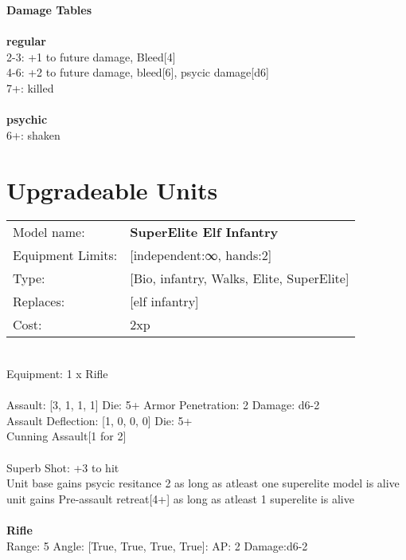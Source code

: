 {\bf Damage Tables} \\
\ \\ {\bf regular } \\
2-3: +1 to future damage, Bleed[4] \\
4-6: +2 to future damage, bleed[6], psycic damage[d6] \\
7+: killed \\
\ \\ {\bf psychic } \\
6+: shaken \\










\pagebreak\section{Upgradeable Units}\noindent
\begin{tabular}{ll}
Model name: &{\bf SuperElite Elf Infantry } \\
Equipment Limits: &[independent:∞, hands:2] \\
Type: &[Bio, infantry, Walks, Elite, SuperElite] \\
Replaces: &[elf infantry] \\
Cost: & 2xp\\
\end{tabular}
\ \\
Equipment: 1 x Rifle \\
\ \\
Assault: [3, 1, 1, 1] Die: 5+ Armor Penetration: 2 Damage: d6-2 \\
Assault Deflection: [1, 0, 0, 0] Die: 5+\\
\indent Cunning Assault[1 for 2]\\ 
 
\ \\
Superb Shot: +3 to hit\\ 
Unit base gains psycic resitance 2 as long as atleast one superelite model is alive\\ 
unit gains Pre-assault retreat[4+] as long as atleast 1 superelite is alive\\ 

\ \\
{\bf Rifle } \\



Range: 5  Angle: [True, True, True, True]: AP: 2 Damage:d6-2 \\





